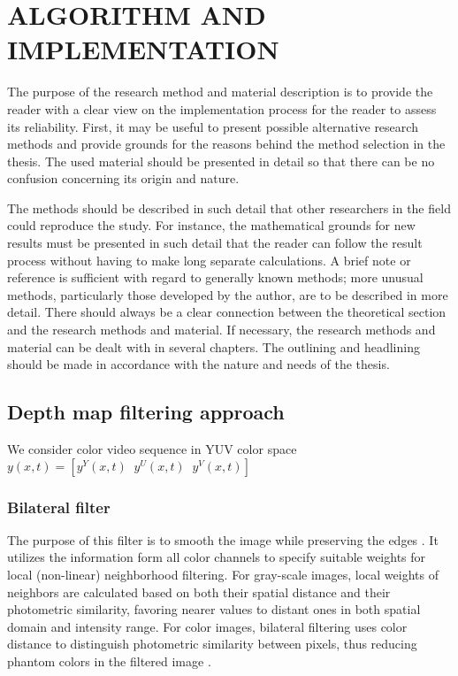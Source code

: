 \chapter{ALGORITHM AND IMPLEMENTATION}

The  purpose  of  the  research  method  and  material  description  is  to  provide  the  reader 
with a clear view on the implementation process for the reader to assess its reliability. 
First,  it  may  be  useful  to  present  possible  alternative  research  methods  and  provide 
grounds  for  the  reasons  behind  the  method  selection  in  the  thesis.  The  used  material 
should be presented in detail so that there can be no confusion concerning its origin and 
nature.  

The  methods  should  be  described  in  such  detail  that  other  researchers  in  the  field 
could reproduce the study. For instance, the mathematical grounds for new results must 
be presented in such detail that the reader can follow the result process without having 
to make long separate calculations. A brief note or reference is sufficient with regard to 
generally known methods; more unusual methods, particularly those developed by the 
author, are to be described in more detail. There should always be a clear connection 
between the theoretical section and the research methods and material. If necessary, the 
research methods and material can be dealt with in several chapters. The outlining and 
headlining should be made in accordance with the nature and needs of the thesis.

\section{Depth map filtering approach}
We consider color video sequence in YUV color space $y(x,t) = [y^Y(x,t)\;\;y^U(x,t)\;\;y^V(x,t)]$

\subsection{Bilateral filter}
The purpose of this filter is to smooth the image while preserving the edges \cite{bilateral_1}. It utilizes the information form all color channels to specify suitable weights for local (non-linear) neighborhood filtering.  For  gray-scale images, local weights of neighbors are calculated based on both their spatial distance and their photometric similarity, favoring nearer values to distant ones in both spatial domain and intensity range. For color images, bilateral filtering uses color distance to distinguish photometric similarity between pixels, thus reducing phantom colors in the filtered image \cite{mobile_3DTV_1}.

